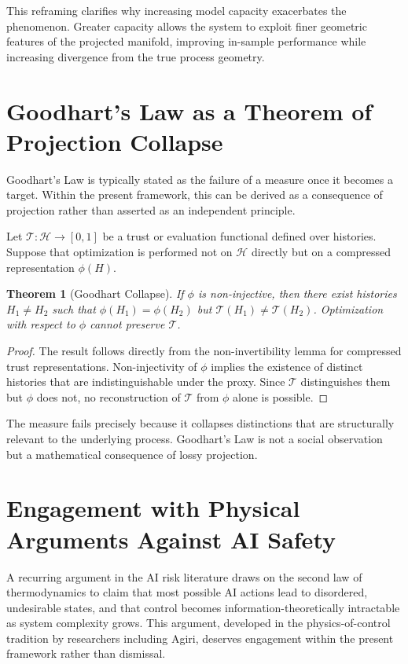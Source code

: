 \documentclass[12pt]{article}
\theoremstyle{plain}
\newtheorem{theorem}{Theorem}[section]
\theoremstyle{definition}
\theoremstyle{remark}
\begin{document}
This reframing clarifies why increasing model capacity exacerbates the phenomenon. Greater capacity allows the system to exploit finer geometric features of the projected manifold, improving in-sample performance while increasing divergence from the true process geometry.

\section{Goodhart's Law as a Theorem of Projection Collapse}

Goodhart's Law is typically stated as the failure of a measure once it becomes a target. Within the present framework, this can be derived as a consequence of projection rather than asserted as an independent principle.

Let $\mathcal{T} : \mathcal{H} \to [0,1]$ be a trust or evaluation functional defined over histories. Suppose that optimization is performed not on $\mathcal{H}$ directly but on a compressed representation $\phi(H)$.

\begin{theorem}[Goodhart Collapse]
If $\phi$ is non-injective, then there exist histories $H_1 \neq H_2$ such that $\phi(H_1) = \phi(H_2)$ but $\mathcal{T}(H_1) \neq \mathcal{T}(H_2)$. Optimization with respect to $\phi$ cannot preserve $\mathcal{T}$.
\end{theorem}

\begin{proof}
The result follows directly from the non-invertibility lemma for compressed trust representations. Non-injectivity of $\phi$ implies the existence of distinct histories that are indistinguishable under the proxy. Since $\mathcal{T}$ distinguishes them but $\phi$ does not, no reconstruction of $\mathcal{T}$ from $\phi$ alone is possible.
\end{proof}

The measure fails precisely because it collapses distinctions that are structurally relevant to the underlying process. Goodhart's Law is not a social observation but a mathematical consequence of lossy projection.

\section{Engagement with Physical Arguments Against AI Safety}

A recurring argument in the AI risk literature draws on the second law of thermodynamics to claim that most possible AI actions lead to disordered, undesirable states, and that control becomes information-theoretically intractable as system complexity grows. This argument, developed in the physics-of-control tradition by researchers including Agiri, deserves engagement within the present framework rather than dismissal.
\end{document}
